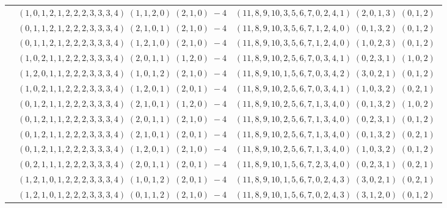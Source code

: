 \documentclass[11pt]{article}
\begin{document}
\begin{longtable}[l]{|c|c|c|}
 \cline{2-3} 
 & $(1 ,0 ,1 ,2 ,1 ,2 ,2 ,2 ,3 ,3 ,3 ,4) \;(1 ,1 ,2 ,0) \;(2 ,1 ,0) \;-4$ & $(11 ,8 ,9 ,10 ,3 ,5 ,6 ,7 ,0 ,2 ,4 ,1) \;(2 ,0 ,1 ,3) \;(0 ,1 ,2) \;$\\ 
 \cline{2-3} 
 & $(0 ,1 ,1 ,2 ,1 ,2 ,2 ,2 ,3 ,3 ,3 ,4) \;(2 ,1 ,0 ,1) \;(2 ,1 ,0) \;-4$ & $(11 ,8 ,9 ,10 ,3 ,5 ,6 ,7 ,1 ,2 ,4 ,0) \;(0 ,1 ,3 ,2) \;(0 ,1 ,2) \;$\\ 
 \cline{2-3} 
 & $(0 ,1 ,1 ,2 ,1 ,2 ,2 ,2 ,3 ,3 ,3 ,4) \;(1 ,2 ,1 ,0) \;(2 ,1 ,0) \;-4$ & $(11 ,8 ,9 ,10 ,3 ,5 ,6 ,7 ,1 ,2 ,4 ,0) \;(1 ,0 ,2 ,3) \;(0 ,1 ,2) \;$\\ 
 \cline{2-3} 
 & $(1 ,0 ,2 ,1 ,1 ,2 ,2 ,2 ,3 ,3 ,3 ,4) \;(2 ,0 ,1 ,1) \;(1 ,2 ,0) \;-4$ & $(11 ,8 ,9 ,10 ,2 ,5 ,6 ,7 ,0 ,3 ,4 ,1) \;(0 ,2 ,3 ,1) \;(1 ,0 ,2) \;$\\ 
 \cline{2-3} 
 & $(1 ,2 ,0 ,1 ,1 ,2 ,2 ,2 ,3 ,3 ,3 ,4) \;(1 ,0 ,1 ,2) \;(2 ,1 ,0) \;-4$ & $(11 ,8 ,9 ,10 ,1 ,5 ,6 ,7 ,0 ,3 ,4 ,2) \;(3 ,0 ,2 ,1) \;(0 ,1 ,2) \;$\\ 
 \cline{2-3} 
 & $(1 ,0 ,2 ,1 ,1 ,2 ,2 ,2 ,3 ,3 ,3 ,4) \;(1 ,2 ,0 ,1) \;(2 ,0 ,1) \;-4$ & $(11 ,8 ,9 ,10 ,2 ,5 ,6 ,7 ,0 ,3 ,4 ,1) \;(1 ,0 ,3 ,2) \;(0 ,2 ,1) \;$\\ 
 \cline{2-3} 
 & $(0 ,1 ,2 ,1 ,1 ,2 ,2 ,2 ,3 ,3 ,3 ,4) \;(2 ,1 ,0 ,1) \;(1 ,2 ,0) \;-4$ & $(11 ,8 ,9 ,10 ,2 ,5 ,6 ,7 ,1 ,3 ,4 ,0) \;(0 ,1 ,3 ,2) \;(1 ,0 ,2) \;$\\ 
 \cline{2-3} 
 & $(0 ,1 ,2 ,1 ,1 ,2 ,2 ,2 ,3 ,3 ,3 ,4) \;(2 ,0 ,1 ,1) \;(2 ,1 ,0) \;-4$ & $(11 ,8 ,9 ,10 ,2 ,5 ,6 ,7 ,1 ,3 ,4 ,0) \;(0 ,2 ,3 ,1) \;(0 ,1 ,2) \;$\\ 
 \cline{2-3} 
 & $(0 ,1 ,2 ,1 ,1 ,2 ,2 ,2 ,3 ,3 ,3 ,4) \;(2 ,1 ,0 ,1) \;(2 ,0 ,1) \;-4$ & $(11 ,8 ,9 ,10 ,2 ,5 ,6 ,7 ,1 ,3 ,4 ,0) \;(0 ,1 ,3 ,2) \;(0 ,2 ,1) \;$\\ 
 \cline{2-3} 
 & $(0 ,1 ,2 ,1 ,1 ,2 ,2 ,2 ,3 ,3 ,3 ,4) \;(1 ,2 ,0 ,1) \;(2 ,1 ,0) \;-4$ & $(11 ,8 ,9 ,10 ,2 ,5 ,6 ,7 ,1 ,3 ,4 ,0) \;(1 ,0 ,3 ,2) \;(0 ,1 ,2) \;$\\ 
 \cline{2-3} 
 & $(0 ,2 ,1 ,1 ,1 ,2 ,2 ,2 ,3 ,3 ,3 ,4) \;(2 ,0 ,1 ,1) \;(2 ,0 ,1) \;-4$ & $(11 ,8 ,9 ,10 ,1 ,5 ,6 ,7 ,2 ,3 ,4 ,0) \;(0 ,2 ,3 ,1) \;(0 ,2 ,1) \;$\\ 
 \cline{2-3} 
 & $(1 ,2 ,1 ,0 ,1 ,2 ,2 ,2 ,3 ,3 ,3 ,4) \;(1 ,0 ,1 ,2) \;(2 ,0 ,1) \;-4$ & $(11 ,8 ,9 ,10 ,1 ,5 ,6 ,7 ,0 ,2 ,4 ,3) \;(3 ,0 ,2 ,1) \;(0 ,2 ,1) \;$\\ 
 \cline{2-3} 
 & $(1 ,2 ,1 ,0 ,1 ,2 ,2 ,2 ,3 ,3 ,3 ,4) \;(0 ,1 ,1 ,2) \;(2 ,1 ,0) \;-4$ & $(11 ,8 ,9 ,10 ,1 ,5 ,6 ,7 ,0 ,2 ,4 ,3) \;(3 ,1 ,2 ,0) \;(0 ,1 ,2) \;$\\ 

\end{longtable}
\end{document}
